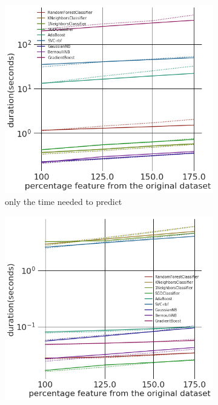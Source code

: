 \documentclass[a4paper,10pt]{article}
\begin{document}
\begin{figure}[H]
	\centering	
	\begin{subfigure}[b]{0.45\textwidth}
		\includegraphics[width=\textwidth]{images/appendix/FeatAddDupRandPredClass.png}
		\caption{only the time needed to predict }
		\label{fig:SADRC2}
	\end{subfigure}
	\begin{subfigure}[b]{0.45\textwidth}
		\includegraphics[width=\textwidth]{images/appendix/FeatAddDupRandPred.png}

\end{subfigure}
\end{figure}
\end{document}
